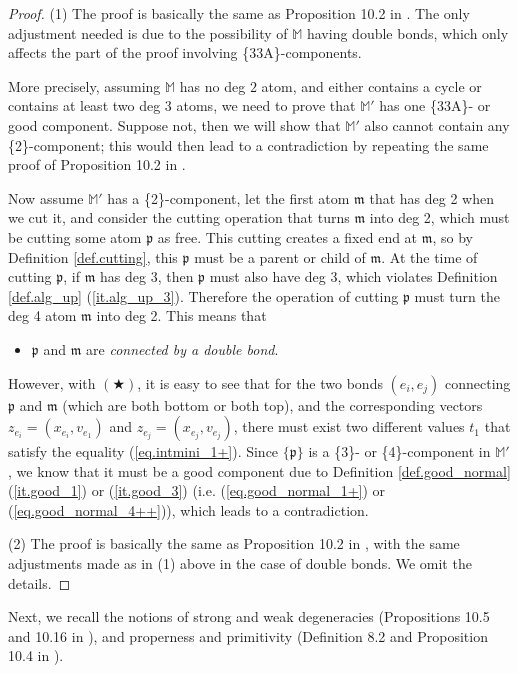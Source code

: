 \documentclass[10pt, reqno]{amsart}
\newcommand{\Mb}{\mathbb M}
\newcommand{\mf}{\mathfrak m}
\newcommand{\pf}{\mathfrak p}
\theoremstyle{definition}
\theoremstyle{remark}
\numberwithin{equation}{section}
\begin{document}
\begin{proof} (1) The proof is basically the same as Proposition 10.2 in \cite{DHM24}. The only adjustment needed is due to the possibility of $\Mb$ having double bonds, which only affects the part of the proof involving \{33A\}-components.

More precisely, assuming $\Mb$ has no deg $2$ atom, and either contains a cycle or contains at least two deg $3$ atoms, we need to prove that $\Mb'$ has one \{33A\}- or good component. Suppose not, then we will show that $\Mb'$ also cannot contain any \{2\}-component; this would then lead to a contradiction by repeating the same proof of Proposition 10.2 in \cite{DHM24}.

Now assume $\Mb'$ has a \{2\}-component, let the first atom $\mf$ that has deg 2 when we cut it, and consider the cutting operation that turns $\mf$ into deg 2, which must be cutting some atom $\pf$ as free. This cutting creates a fixed end at $\mf$, so by Definition \ref{def.cutting}, this $\pf$ must be a parent or child of $\mf$. At the time of cutting $\pf$, if $\mf$ has deg 3, then $\pf$ must also have deg 3, which violates Definition \ref{def.alg_up} (\ref{it.alg_up_3}). Therefore the operation of cutting $\pf$ must turn the deg 4 atom $\mf$ into deg 2. This means that
\begin{itemize}[$(\bigstar)$]
\item $\pf$ and $\mf$ are \emph{connected by a double bond}.
\end{itemize}
However, with $(\bigstar)$, it is easy to see that for the two bonds $(e_i,e_j)$ connecting $\pf$ and $\mf$ (which are both bottom or both top), and the corresponding vectors $z_{e_i}=(x_{e_i},v_{e_1})$ and $z_{e_j}=(x_{e_j},v_{e_j})$, there must exist two different values $t_1$ that satisfy the equality (\ref{eq.intmini_1+}). Since $\{\pf\}$ is a \{3\}- or \{4\}-component in $\Mb'$, we know that it must be a good component due to Definition \ref{def.good_normal} (\ref{it.good_1}) or (\ref{it.good_3}) (i.e. (\ref{eq.good_normal_1+}) or (\ref{eq.good_normal_4++})), which leads to a contradiction.

(2) The proof is basically the same as Proposition 10.2 in \cite{DHM24}, with the same adjustments made as in (1) above in the case of double bonds. We omit the details.
\end{proof}
Next, we recall the notions of strong and weak degeneracies (Propositions 10.5 and 10.16 in \cite{DHM24}), and properness and primitivity (Definition 8.2 and Proposition 10.4 in \cite{DHM24}).
\end{document}
